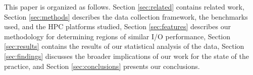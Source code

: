 This paper is organized as follows. Section \ref{sec:related} contains related work, Section \ref{sec:methods} describes the data collection framework, the benchmarks used, and the HPC platforms studied, Section \ref{sec:features} describes our methodology for determining regions of similar I/O performance, Section \ref{sec:results} contains the results of our statistical analysis of the data, Section \ref{sec:findings}  discusses the broader implications of our work for the state of the practice, and Section \ref{sec:conclusions} presents our conclusions. 

